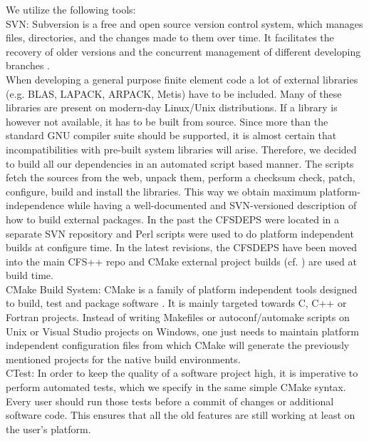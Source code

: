 We utilize the following tools:\\

\noindent
{\sf SVN:} Subversion is a free and open source version control
  system, which manages files, directories, and the changes made to
  them over time. It facilitates the recovery of older versions and the
concurrent management of  different developing branches \cite{svn}.\\

 When developing a general purpose finite element code
a lot  of external libraries  (e.g.  BLAS, LAPACK,  ARPACK, Metis) have  to be
included.   Many  of these  libraries  are  present  on modern-day  Linux/Unix
distributions.  If a library is however not available, it has to be built from
source. Since more  than the standard GNU compiler  suite should be supported,
it is  almost certain that  incompatibilities with pre-built  system libraries
will  arise.   Therefore, we  decided  to build  all  our  dependencies in  an
automated script  based manner.  The scripts  fetch the sources  from the web,
unpack them, perform a checksum check, patch, configure, build and install the
libraries.  This  way we obtain  maximum platform-independence while  having a
well-documented  and  SVN-versioned  description  of  how  to  build  external
packages. In  the past the CFSDEPS  were located in a  separate SVN repository
and  Perl scripts were  used to  do platform  independent builds  at configure
time. In the latest revisions, the CFSDEPS have been moved into the main CFS++
repo and CMake external  project builds (cf. \cite{BuildExtPackages}) are used
at build time.  \\

\noindent
{\sf CMake Build System:}  CMake is a family of platform
independent tools designed to  build, test and package software
\cite{Martin2007a}. %
It   is   mainly   targeted   towards  C,   C++   or   Fortran
projects. 
Instead of writing Makefiles or autoconf/automake scripts on Unix or
Visual  Studio  projects on  Windows,  one  just  needs to  maintain  platform
independent configuration files from  which CMake will generate the previously
mentioned projects for the native build environments.\\

%
\noindent
{\sf CTest:} In order to keep  the quality of a software project high, it
is imperative to perform automated tests, which we specify in the same
simple CMake syntax.  
Every user should run 
those tests before a commit of changes or additional software
code. This ensures that all the old features are still working at
least on the user's platform.\\ 


